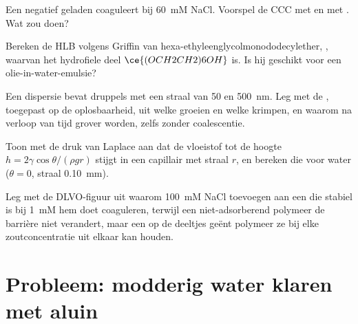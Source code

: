 \begin{exercise}[$\star\star$]\label{exo:b3:colloids:8}
Een negatief geladen  coaguleert bij \qty{60}{mM} NaCl. Voorspel de CCC met 
en met . Wat zou  doen?
\end{exercise}

\begin{exercise}[$\star\star$]\label{exo:b3:colloids:9}
Bereken de HLB volgens Griffin van hexa-ethyleenglycolmonododecylether,
, waarvan het hydrofiele deel $\ce{(OCH2CH2)6OH}$ is. Is hij geschikt
voor een olie-in-water-emulsie?
\end{exercise}

\begin{exercise}[$\star\star\star$]\label{exo:b3:colloids:10}
Een dispersie bevat druppels met een straal van 50 en \qty{500}{nm}. Leg
met de , toegepast op de oplosbaarheid, uit welke
groeien en welke krimpen, en waarom  na verloop van tijd grover
worden, zelfs zonder coalescentie.
\end{exercise}

\begin{exercise}[$\star\star\star$]\label{exo:b3:colloids:11}
Toon met de druk van Laplace aan dat de vloeistof tot de hoogte $h = 2\gamma\cos\theta/(\rho gr)$ stijgt in een
capillair met straal $r$, en bereken die voor water ($\theta = 0$, straal \qty{0.10}{mm}).
\end{exercise}

\begin{exercise}[$\star\star\star$]\label{exo:b3:colloids:12}
Leg met de DLVO-figuur uit waarom \qty{100}{mM} NaCl toevoegen aan een  die stabiel is bij \qty{1}{mM}
hem doet coaguleren, terwijl een niet-adsorberend polymeer de barrière
niet verandert, maar een op de deeltjes geënt polymeer ze bij elke
zoutconcentratie uit elkaar kan houden.
\end{exercise}

\clearpage
\enlargethispage{3\baselineskip}
\section{Probleem: modderig water klaren met aluin}

